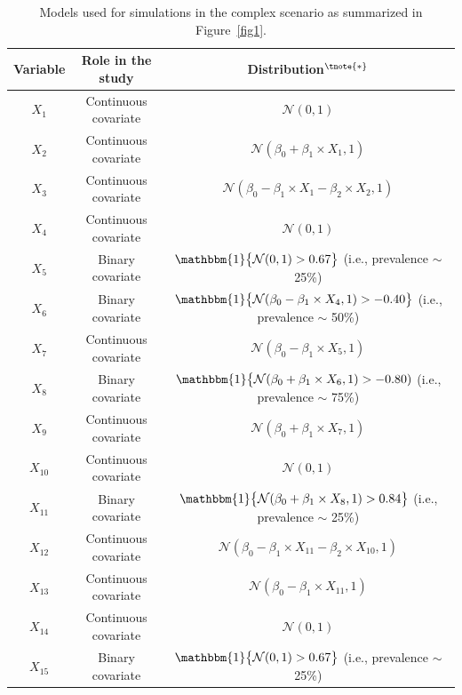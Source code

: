 \documentclass{article}
\begin{document}
    
\begin{center}
\begin{table}[!ht]%
\scriptsize
\caption{Models used for simulations in the complex scenario as summarized in Figure~\ref{fig1}.\label{tabS1}}
\begin{tabular*}{\textwidth}{@{\extracolsep\fill}ccc@{}}
\toprule
\textbf{Variable} &  \textbf{Role in the study}  & \textbf{Distribution}$^{\tnote{\bf *}}$   \\ \hline
$X_1$  & Continuous   covariate  & $\mathcal{N} (0,1)$           \\
$X_2$  & Continuous    covariate &      $\mathcal{N} (\beta_0 + \beta_1 \times X_1, 1)$               \\
$X_3$   & Continuous  covariate  &    $\mathcal{N} (\beta_0  - \beta_1  \times X_1 -  \beta_2  \times X_2 , 1)$               \\
$X_4$  & Continuous   covariate &        $\mathcal{N} (0,1)$               \\
$X_5$  & Binary   covariate  &               $\mathbbm{1} \big \{ \mathcal{N} (0,1)> 0.67 \big \}$  (i.e., prevalence $\sim$ 25\%)              \\
$X_6$  & Binary   covariate  &       $\mathbbm{1} \big \{ \mathcal{N} (\beta_0 - \beta_1 \times X_4, 1)> -0.40 \big \}$  (i.e., prevalence $\sim$  50\%)         \\
$X_7$ & Continuous   covariate &          $\mathcal{N} (\beta_0 - \beta_1 \times X_5,  1)$         \\
$X_8$  & Binary  covariate    &         $\mathbbm{1} \big \{  \mathcal{N} (\beta_0 + \beta_1 \times X_6,  1)> -0.80)$  (i.e., prevalence $\sim$  75\%)    \\
$X_9$  & Continuous   covariate &   $\mathcal{N} (\beta_0 + \beta_1 \times X_7, 1)$  \\
$X_{10}$  & Continuous  covariate   &  $\mathcal{N} (0,1)$ \\
$X_{11}$  & Binary  covariate   & $\mathbbm{1}  \big \{  \mathcal{N} (\beta_0 + \beta_1 \times X_8, 1)> 0.84 \big \}$ (i.e., prevalence $\sim$  25\%)  \\
$X_{12}$ & Continuous  covariate &  $\mathcal{N} (\beta_0  - \beta_1  \times X_{11} -  \beta_2  \times X_{10} , 1)$ \\
$X_{13}$ & Continuous  covariate   &  $\mathcal{N} (\beta_0 - \beta_1 \times X_{11}, 1)$ \\
$X_{14}$ & Continuous  covariate   &    $\mathcal{N} (0,1)$ \\
$X_{15}$ & Binary  covariate   & $\mathbbm{1} \big \{ \mathcal{N} (0,1)> 0.67 \big \}$ (i.e., prevalence $\sim$ 25\%)  \\

\end{tabular*}
\end{table}
\end{center}
\end{document}
